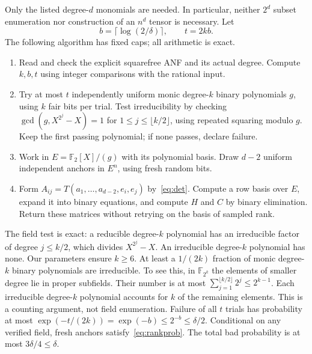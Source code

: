 \documentclass[11pt]{article}
\theoremstyle{remark}\newtheorem{remark}[theorem]{Remark}
\newcommand{\F}{\mathbb F}
\begin{document}
Only the listed degree-$d$ monomials are needed. In particular, neither $2^d$ subset enumeration nor construction of an $n^d$ tensor is necessary.
Let
\[
 b=\lceil\log(2/\delta)\rceil,\qquad t=2kb.
\]
The following algorithm has fixed caps; all arithmetic is exact.
\begin{enumerate}
\item Read and check the explicit squarefree ANF and its actual degree. Compute $k,b,t$ using integer comparisons with the rational input.
\item Try at most $t$ independently uniform monic degree-$k$ binary polynomials $g$, using $k$ fair bits per trial. Test irreducibility by checking
$\gcd(g,X^{2^j}-X)=1$ for $1\le j\le\lfloor k/2\rfloor$, using repeated squaring modulo $g$. Keep the first passing polynomial; if none passes, declare failure.
\item Work in $E=\F_2[X]/(g)$ with its polynomial basis. Draw $d-2$ uniform independent anchors in $E^n$, using fresh random bits.
\item Form $A_{ij}=T(a_1,\ldots,a_{d-2},e_i,e_j)$ by~\eqref{eq:det}. Compute a row basis over $E$, expand it into binary equations, and compute $H$ and $C$ by binary elimination. Return these matrices without retrying on the basis of sampled rank.
\end{enumerate}

The field test is exact: a reducible degree-$k$ polynomial has an irreducible factor of degree $j\le k/2$, which divides $X^{2^j}-X$. An irreducible degree-$k$ polynomial has none.
Our parameters ensure $k\ge6$. At least a $1/(2k)$ fraction of monic degree-$k$ binary polynomials are irreducible. To see this, in $\F_{2^k}$ the elements of smaller degree lie in proper subfields. Their number is at most
$\sum_{j=1}^{\lfloor k/2\rfloor}2^j\le2^{k-1}$.
Each irreducible degree-$k$ polynomial accounts for $k$ of the remaining elements. This is a counting argument, not field enumeration.
Failure of all $t$ trials has probability at most
$\exp(-t/(2k))=\exp(-b)\le2^{-b}\le\delta/2$.
Conditional on any verified field, fresh anchors satisfy~\eqref{eq:rankprob}.
The total bad probability is at most $3\delta/4\le\delta$.
\end{document}
